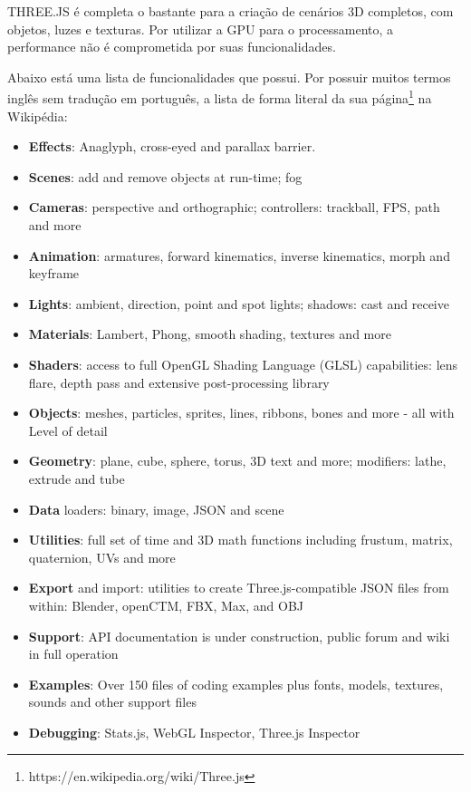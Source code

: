 \documentclass[a4paper,12pt]{article}
\begin{document}
THREE.JS é completa o bastante para a criação de cenários 3D completos, com objetos, luzes e texturas. Por utilizar a GPU para o processamento, a performance não é comprometida por suas funcionalidades.

Abaixo está uma lista de funcionalidades que possui. Por possuir muitos termos inglês sem tradução em português, a lista de forma literal da sua página\footnote{https://en.wikipedia.org/wiki/Three.js} na Wikipédia:

\begin{itemize}

  \item \textbf{Effects}: Anaglyph, cross-eyed and parallax barrier.

  \item \textbf{Scenes}: add and remove objects at run-time; fog

  \item \textbf{Cameras}: perspective and orthographic; controllers: trackball, FPS, path and more

  \item \textbf{Animation}: armatures, forward kinematics, inverse kinematics, morph and keyframe

  \item \textbf{Lights}: ambient, direction, point and spot lights; shadows: cast and receive

  \item \textbf{Materials}: Lambert, Phong, smooth shading, textures and more

  \item \textbf{Shaders}: access to full OpenGL Shading Language (GLSL) capabilities: lens flare, depth pass and extensive post-processing library

  \item \textbf{Objects}: meshes, particles, sprites, lines, ribbons, bones and more - all with Level of detail

  \item \textbf{Geometry}: plane, cube, sphere, torus, 3D text and more; modifiers: lathe, extrude and tube

  \item \textbf{Data} loaders: binary, image, JSON and scene

  \item \textbf{Utilities}: full set of time and 3D math functions including frustum, matrix, quaternion, UVs and more

  \item \textbf{Export} and import: utilities to create Three.js-compatible JSON files from within: Blender, openCTM, FBX, Max, and OBJ

  \item \textbf{Support}: API documentation is under construction, public forum and wiki in full operation

  \item \textbf{Examples}: Over 150 files of coding examples plus fonts, models, textures, sounds and other support files

  \item \textbf{Debugging}: Stats.js, WebGL Inspector, Three.js Inspector
\end{itemize}
\end{document}
